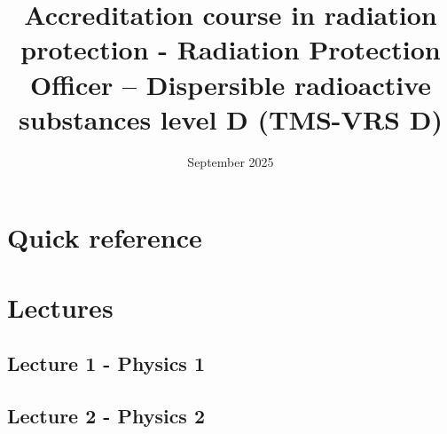 \documentclass{report}
\title{Accreditation course in radiation protection - Radiation Protection Officer – Dispersible radioactive substances level D (TMS-VRS D)}
\date{September 2025}
\begin{document}
\maketitle
\tableofcontents
\part{Quick reference}
\part{Lectures}
\chapter{Lecture 1 - Physics 1}

\chapter{Lecture 2 - Physics 2}

\end{document}
